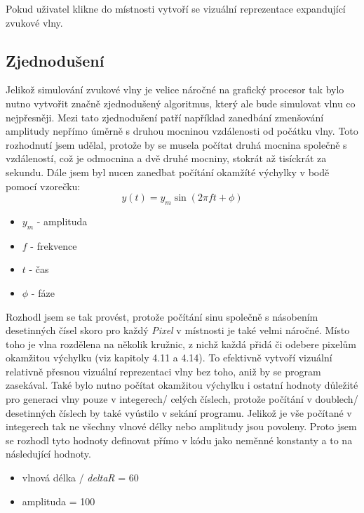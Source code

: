 Pokud uživatel klikne do místnosti vytvoří se vizuální reprezentace expandující  zvukové vlny. 

\subsection{Zjednodušení}
Jelikož simulování zvukové vlny je velice náročné na grafický procesor tak bylo nutno vytvořit značně zjednodušený algoritmus, který ale bude simulovat vlnu co nejpřesněji. Mezi tato zjednodušení patří například zanedbání zmenšování amplitudy nepřímo úměrně s druhou mocninou vzdálenosti od počátku vlny. Toto rozhodnutí jsem udělal, protože by se musela počítat druhá mocnina společně s vzdáleností, což je odmocnina a dvě druhé mocniny, stokrát až tisíckrát za sekundu. Dále jsem byl nucen zanedbat počítání okamžíté výchylky v bodě pomocí vzorečku:
\[
y(t) = y_m \sin(2\pi f t + \phi)
\]

\begin{itemize}
    \item \( y_m \) - amplituda
    \item \( f \) - frekvence
    \item \( t \) - čas
    \item \( \phi \) - fáze
\end{itemize}

Rozhodl jsem se tak provést, protože počítání sinu společně s násobením desetinných čísel skoro pro každý \textit{Pixel} v místnosti je také velmi náročné. Místo toho je vlna rozdělena na několik kružnic, z nichž každá přidá či odebere pixelům okamžitou výchylku (viz kapitoly 4.11 a 4.14). To efektivně vytvoří vizuální relativně přesnou vizuální reprezentaci vlny bez toho, aniž by se program zasekával. Také bylo nutno počítat okamžitou výchylku i ostatní hodnoty důležité pro generaci vlny  pouze v integerech/ celých číslech, protože počítání v doublech/ desetinných číslech by také vyústilo v sekání programu. Jelikož je vše počítané v integerech tak ne všechny vlnové délky nebo amplitudy jsou povoleny. Proto jsem se rozhodl tyto hodnoty definovat přímo v kódu jako neměnné konstanty a to na následující hodnoty.

\begin{itemize}
    \item vlnová délka / \textit{deltaR} = 60
    \item amplituda = 100
\end{itemize}